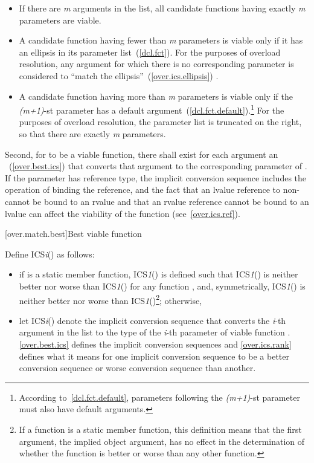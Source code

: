 \begin{itemize}
\item
If there are
\textit{m}
arguments in the list, all candidate
functions having exactly
\textit{m}
parameters are viable.
\item
A candidate function having fewer than
\textit{m}
parameters is
viable only if it has an ellipsis in its parameter list~(\ref{dcl.fct}).
For the purposes of overload resolution,
any argument for which there is no corresponding parameter is
considered to ``match the ellipsis''~(\ref{over.ics.ellipsis}) .
\item
A candidate function having more than
\textit{m}
parameters is viable
only if the
\textit{(m+1)}-st
parameter has a default
argument~(\ref{dcl.fct.default}).\footnote{According to~\ref{dcl.fct.default},
parameters following the
\textit{(m+1)}-st
parameter must also have default arguments.}
For the purposes of overload
resolution, the parameter list is truncated on the right, so
that there are exactly
\textit{m}
parameters.
\end{itemize}

\pnum
Second, for
to be a viable function, there shall exist for each
argument an
~(\ref{over.best.ics}) that
converts that argument to the corresponding parameter of
.
If the parameter has reference type, the implicit conversion sequence
includes the operation of binding the reference, and the fact that
an lvalue reference to non- cannot be bound to an rvalue
and that an rvalue reference cannot be bound to an lvalue
can affect
the viability of the function (see~\ref{over.ics.ref}).

[over.match.best]{Best viable function}%

\pnum
{}%
Define ICS\textit{i}() as follows:

\begin{itemize}
\item
if
is a static member function, ICS\textit{1}() is defined such that
ICS\textit{1}() is neither better nor worse than ICS\textit{1}()
for any function
,
and, symmetrically, ICS\textit{1}() is neither better nor worse than
ICS\textit{1}()\footnote{If a function is a static member function, this
definition means that the first argument, the implied object argument,
has no effect in the determination of whether the function is better
or worse than any other function.};
otherwise,
\item
let ICS\textit{i}() denote the implicit conversion sequence that converts
the \textit{i}-th argument in the list to the type of the
\textit{i}-th
parameter
of viable function
.
\ref{over.best.ics} defines the implicit conversion sequences and \ref{over.ics.rank}
defines what it means for one implicit conversion sequence to be
a better conversion sequence or worse conversion sequence than
another.
\end{itemize}

